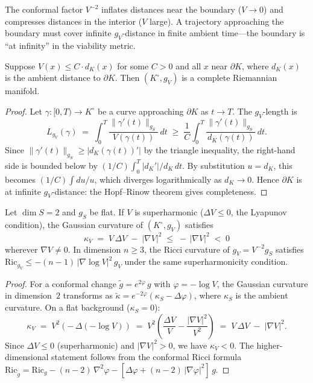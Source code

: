The conformal factor $V^{-2}$ inflates distances near the boundary
($V \to 0$) and compresses distances in the interior ($V$ large).
A trajectory approaching the boundary must cover infinite
$g_V$-distance in finite ambient time---the boundary is ``at
infinity'' in the viability metric.

\begin{proposition}[Completeness]\label{prop:viab-complete}
Suppose $V(x) \leq C \cdot d_K(x)$ for some $C > 0$
and all $x$ near $\partial K$, where $d_K(x)$ is the ambient
distance to $\partial K$.  Then $(K^\circ, g_V)$ is a complete
Riemannian manifold.
\end{proposition}

\begin{proof}
Let $\gamma: [0, T) \to K^\circ$ be a curve approaching $\partial K$
as $t \to T$.  The $g_V$-length is
\[
  L_{g_V}(\gamma)
  \;=\;
  \int_0^T \frac{\|\gamma'(t)\|_{g_S}}{V(\gamma(t))}\, dt
  \;\geq\;
  \frac{1}{C}
  \int_0^T \frac{\|\gamma'(t)\|_{g_S}}{d_K(\gamma(t))}\, dt.
\]
Since $\|\gamma'(t)\|_{g_S} \geq |d_K(\gamma(t))'|$ by the
triangle inequality, the right-hand side is bounded below by
$(1/C)\int_0^T |d_K'|/d_K\,dt$.  By substitution $u = d_K$,
this becomes $(1/C)\int du/u$, which diverges logarithmically
as $d_K \to 0$.
Hence $\partial K$ is at infinite $g_V$-distance: the Hopf--Rinow
theorem gives completeness.
\end{proof}

\begin{proposition}\label{prop:neg-curvature}
Let $\dim S = 2$ and $g_S$ be flat.  If $V$ is superharmonic
($\Delta V \leq 0$, the Lyapunov condition), the Gaussian curvature
of $(K^\circ, g_V)$ satisfies
\[
  \kappa_V
  \;=\;
  V \,\Delta V \;-\; |\nabla V|^2
  \;\leq\;
  -\,|\nabla V|^2
  \;<\; 0
\]
wherever $\nabla V \neq 0$.  In dimension $n \geq 3$, the Ricci
curvature of $g_V = V^{-2} g_S$ satisfies
$\mathrm{Ric}_{g_V} \leq -(n-1)\,|\nabla \log V|^2\, g_V$
under the same superharmonicity condition.
\end{proposition}

\begin{proof}
For a conformal change $\tilde{g} = e^{2\varphi}\, g$ with
$\varphi = -\log V$, the Gaussian curvature in dimension~$2$
transforms as
$\tilde\kappa = e^{-2\varphi}(\kappa_S - \Delta\varphi)$,
where $\kappa_S$ is the ambient curvature.
On a flat background ($\kappa_S = 0$):
\[
  \kappa_V
  \;=\;
  V^2\!\left(-\,\Delta(-\log V)\right)
  \;=\;
  V^2\!\left(\frac{\Delta V}{V} - \frac{|\nabla V|^2}{V^2}\right)
  \;=\;
  V\,\Delta V \;-\; |\nabla V|^2.
\]
Since $\Delta V \leq 0$ (superharmonic) and $|\nabla V|^2 > 0$,
we have $\kappa_V < 0$.  The higher-dimensional statement follows
from the conformal Ricci formula
$\mathrm{Ric}_{\tilde g} = \mathrm{Ric}_g - (n-2)\,
\nabla^2\varphi - [\Delta\varphi + (n-2)\,|\nabla\varphi|^2]\,g$.
\end{proof}


